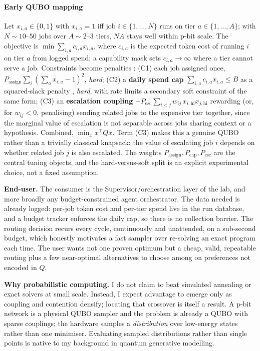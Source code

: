 \documentclass{article}
\begin{document}
\paragraph{Early QUBO mapping}
Let $x_{i,a}\in\{0,1\}$ with $x_{i,a}=1$ iff job $i\in\{1,\dots,N\}$ runs on tier $a\in\{1,\dots,A\}$; with $N\!\sim\!10$--$50$ jobs over $A\!\sim\!2$--$3$ tiers, $NA$ stays well within p-bit scale. The objective is $\min\sum_{i,a} c_{i,a}x_{i,a}$, where $c_{i,a}$ is the expected token cost of running $i$ on tier $a$ from logged spend; a capability mask sets $c_{i,a}\!\to\!\infty$ where a tier cannot serve a job. Constraints become penalties \citep{lucas2014ising}: (C1) each job assigned once, $P_{\text{assign}}\sum_i(\sum_a x_{i,a}-1)^2$, \emph{hard}; (C2) a \textbf{daily spend cap} $\sum_{i,a} c_{i,a}x_{i,a}\le B$ as a squared-slack penalty \citep{coffman1997binpacking}, \emph{hard}, with rate limits a secondary soft constraint of the same form; (C3) an \textbf{escalation coupling} $-P_{\text{esc}}\sum_{i<j} w_{ij}\,x_{i,\text{hi}}x_{j,\text{hi}}$ rewarding (or, for $w_{ij}<0$, penalising) sending related jobs to the expensive tier together, since the marginal value of escalation is not separable across jobs sharing context or a hypothesis. Combined, $\min_x x^{\top}Qx$. Term (C3) makes this a genuine QUBO rather than a trivially classical knapsack: the value of escalating job $i$ depends on whether related job $j$ is also escalated. The weights $P_{\text{assign}},P_{\text{cap}},P_{\text{esc}}$ are the central tuning objects, and the hard-versus-soft split \citep{fisher1981lagrangian} is an explicit experimental choice, not a fixed assumption.

\textbf{End-user.} The consumer is the Supervisor/orchestration layer of the lab, and more broadly any budget-constrained agent orchestrator. The data needed is already logged: per-job token cost and per-tier spend live in the run database, and a budget tracker enforces the daily cap, so there is no collection barrier. The routing decision recurs every cycle, continuously and unattended, on a sub-second budget, which honestly motivates a fast sampler over re-solving an exact program each time. The user wants not one proven optimum but a cheap, valid, repeatable routing plus a few near-optimal alternatives to choose among on preferences not encoded in $Q$.

\textbf{Why probabilistic computing.} I do not claim to beat simulated annealing or exact solvers at small scale. Instead, I expect advantage to emerge only as coupling and contention densify; locating that crossover is itself a result. A p-bit network is a physical QUBO sampler and the problem is already a QUBO with sparse couplings; the hardware samples a \emph{distribution} over low-energy states rather than one minimiser. Evaluating sampled distributions rather than single points is native to my background in quantum generative modelling.
\end{document}
